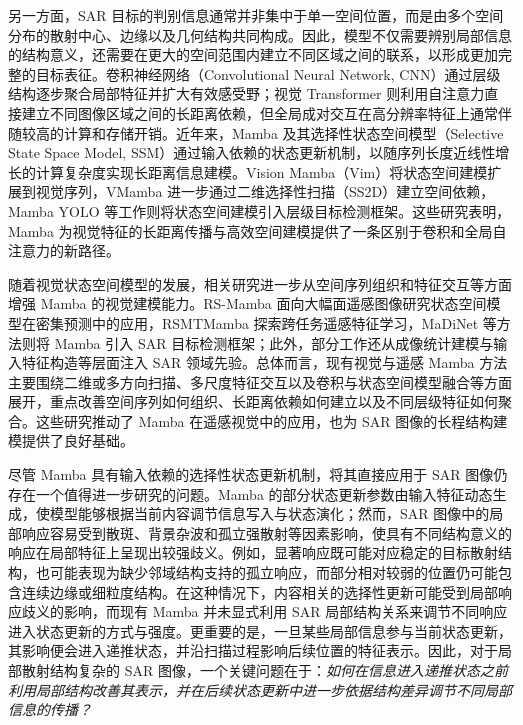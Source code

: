 \documentclass[UTF8,12pt,a4paper]{ctexart}
\begin{document}
另一方面，SAR 目标的判别信息通常并非集中于单一空间位置，而是由多个空间分布的散射中心、边缘以及几何结构共同构成。因此，模型不仅需要辨别局部信息的结构意义，还需要在更大的空间范围内建立不同区域之间的联系，以形成更加完整的目标表征。卷积神经网络（Convolutional Neural Network, CNN）通过层级结构逐步聚合局部特征并扩大有效感受野\cite{resnet2015}；视觉 Transformer 则利用自注意力直接建立不同图像区域之间的长距离依赖\cite{vit2020}，但全局成对交互在高分辨率特征上通常伴随较高的计算和存储开销。近年来，Mamba 及其选择性状态空间模型（Selective State Space Model, SSM）通过输入依赖的状态更新机制，以随序列长度近线性增长的计算复杂度实现长距离信息建模\cite{mamba2023}。Vision Mamba（Vim）将状态空间建模扩展到视觉序列\cite{vim2024}，VMamba 进一步通过二维选择性扫描（SS2D）建立空间依赖\cite{vmamba2024}，Mamba YOLO 等工作则将状态空间建模引入层级目标检测框架\cite{mambayolo2024}。这些研究表明，Mamba 为视觉特征的长距离传播与高效空间建模提供了一条区别于卷积和全局自注意力的新路径。

随着视觉状态空间模型的发展，相关研究进一步从空间序列组织和特征交互等方面增强 Mamba 的视觉建模能力。RS-Mamba 面向大幅面遥感图像研究状态空间模型在密集预测中的应用\cite{rsmamba2024}，RSMTMamba 探索跨任务遥感特征学习\cite{rstmtmamba2025}，MaDiNet 等方法则将 Mamba 引入 SAR 目标检测框架\cite{madinet2025}；此外，部分工作还从成像统计建模与输入特征构造等层面注入 SAR 领域先验\cite{mambadip,rssnet}。总体而言，现有视觉与遥感 Mamba 方法主要围绕二维或多方向扫描、多尺度特征交互以及卷积与状态空间模型融合等方面展开，重点改善空间序列如何组织、长距离依赖如何建立以及不同层级特征如何聚合。这些研究推动了 Mamba 在遥感视觉中的应用，也为 SAR 图像的长程结构建模提供了良好基础。

尽管 Mamba 具有输入依赖的选择性状态更新机制，将其直接应用于 SAR 图像仍存在一个值得进一步研究的问题。Mamba 的部分状态更新参数由输入特征动态生成，使模型能够根据当前内容调节信息写入与状态演化；然而，SAR 图像中的局部响应容易受到散斑、背景杂波和孤立强散射等因素影响，使具有不同结构意义的响应在局部特征上呈现出较强歧义。例如，显著响应既可能对应稳定的目标散射结构，也可能表现为缺少邻域结构支持的孤立响应，而部分相对较弱的位置仍可能包含连续边缘或细粒度结构。在这种情况下，内容相关的选择性更新可能受到局部响应歧义的影响，而现有 Mamba 并未显式利用 SAR 局部结构关系来调节不同响应进入状态更新的方式与强度。更重要的是，一旦某些局部信息参与当前状态更新，其影响便会进入递推状态，并沿扫描过程影响后续位置的特征表示。因此，对于局部散射结构复杂的 SAR 图像，一个关键问题在于：\emph{如何在信息进入递推状态之前利用局部结构改善其表示，并在后续状态更新中进一步依据结构差异调节不同局部信息的传播？}
\end{document}
